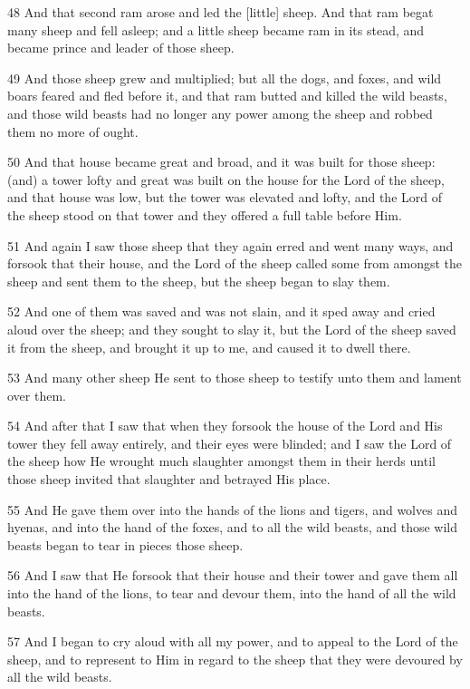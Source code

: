 \par 48 And that second ram arose and led the [little] sheep. And that ram begat many sheep and fell asleep; and a little sheep became ram in its stead, and became prince and leader of those sheep.
\par 49 And those sheep grew and multiplied; but all the dogs, and foxes, and wild boars feared and fled before it, and that ram butted and killed the wild beasts, and those wild beasts had no longer any power among the sheep and robbed them no more of ought. 
\par 50 And that house became great and broad, and it was built for those sheep: (and) a tower lofty and great was built on the house for the Lord of the sheep, and that house was low, but the tower was elevated and lofty, and the Lord of the sheep stood on that tower and they offered a full table before Him.
\par 51 And again I saw those sheep that they again erred and went many ways, and forsook that their house, and the Lord of the sheep called some from amongst the sheep and sent them to the sheep, but the sheep began to slay them.
\par 52 And one of them was saved and was not slain, and it sped away and cried aloud over the sheep; and they sought to slay it, but the Lord of the sheep saved it from the sheep, and brought it up to me, and caused it to dwell there.
\par 53 And many other sheep He sent to those sheep to testify unto them and lament over them.
\par 54 And after that I saw that when they forsook the house of the Lord and His tower they fell away entirely, and their eyes were blinded; and I saw the Lord of the sheep how He wrought much slaughter amongst them in their herds until those sheep invited that slaughter and betrayed His place.
\par 55 And He gave them over into the hands of the lions and tigers, and wolves and hyenas, and into the hand of the foxes, and to all the wild beasts, and those wild beasts began to tear in pieces those sheep.
\par 56 And I saw that He forsook that their house and their tower and gave them all into the hand of the lions, to tear and devour them, into the hand of all the wild beasts.
\par 57 And I began to cry aloud with all my power, and to appeal to the Lord of the sheep, and to represent to Him in regard to the sheep that they were devoured by all the wild beasts.
